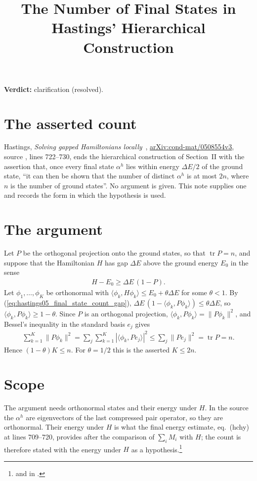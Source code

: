 \documentclass{article}
\title{The Number of Final States in Hastings' Hierarchical Construction}
\author{}
\date{}
\providecommand{\gapnote}[2]{\par\noindent\textbf{Verdict:} #1 (#2).\par}
\begin{document}
\maketitle
\gapnote{clarification}{resolved}

\section{The asserted count}
Hastings, \emph{Solving gapped Hamiltonians locally}~\cite{Hastings2006Solving},
\href{https://arxiv.org/abs/cond-mat/0508554v3}{arXiv:cond-mat/0508554v3},
source , lines 722--730, ends the hierarchical construction
of Section~II with the assertion that, once every final state $\alpha^h$ lies
within energy $\Delta E/2$ of the ground state, ``it can then be shown that
the number of distinct $\alpha^h$ is at most $2n$, where $n$ is the number of
ground states''. No argument is given. This note supplies one and records the
form in which the hypothesis is used.

\section{The argument}
Let $P$ be the orthogonal projection onto the ground states, so that
$\operatorname{tr}P=n$, and suppose that the Hamiltonian $H$ has gap $\Delta E$
above the ground energy $E_0$ in the sense
\begin{align}
 H-E_0\ge\Delta E\,(1-P).
 \label{eq:hastings05_final_state_count_gap}
\end{align}
Let $\phi_1,\dots,\phi_K$ be orthonormal with
$\langle\phi_k,H\phi_k\rangle\le E_0+\theta\Delta E$ for some $\theta<1$. By
(\ref{eq:hastings05_final_state_count_gap}),
$\Delta E\,(1-\langle\phi_k,P\phi_k\rangle)\le\theta\Delta E$, so
$\langle\phi_k,P\phi_k\rangle\ge1-\theta$. Since $P$ is an orthogonal
projection, $\langle\phi_k,P\phi_k\rangle=\|P\phi_k\|^2$, and Bessel's
inequality in the standard basis $e_j$ gives
\begin{align}
 \sum_{k=1}^K\|P\phi_k\|^2
 =\sum_j\sum_{k=1}^K|\langle\phi_k,Pe_j\rangle|^2
 \le\sum_j\|Pe_j\|^2=\operatorname{tr}P=n.
 \label{eq:hastings05_final_state_count_bessel}
\end{align}
Hence $(1-\theta)K\le n$. For $\theta=1/2$ this is the asserted $K\le2n$.

\section{Scope}
The argument needs orthonormal states and their energy under $H$. In the source
the $\alpha^h$ are eigenvectors of the last compressed pair operator, so they
are orthonormal. Their energy under $H$ is what the final energy estimate,
eq.~(hchy) at lines 709--720, provides after the comparison of
$\sum_iM_i$ with $H$; the count is therefore stated with the energy under $H$
as a hypothesis.\footnote{ and
     in
    .}


\end{document}
